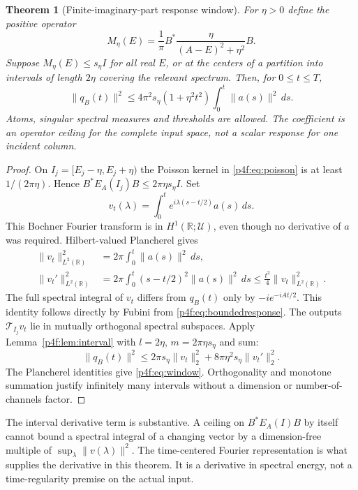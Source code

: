 \documentclass[11pt]{article}
\numberwithin{equation}{section}
\newtheorem{theorem}{Theorem}[section]
\theoremstyle{definition}
\theoremstyle{remark}
\begin{document}
\begin{theorem}[Finite-imaginary-part response window]
\label{p4f:thm:window}
For $\eta>0$ define the positive operator
\begin{equation}\label{p4f:eq:poisson}
 M_\eta(E)=\frac1\pi B^*
             \frac{\eta}{(A-E)^2+\eta^2}B .
\end{equation}
Suppose $M_\eta(E)\le s_\eta I$ for all real $E$,
or at the centers of a partition into intervals of
length $2\eta$ covering the relevant spectrum.
Then, for $0\le t\le T$,
\begin{equation}\label{p4f:eq:window}
 \|q_B(t)\|^2\le
 4\pi^2s_\eta(1+\eta^2t^2)
                   \int_0^t\|a(s)\|^2\,ds .
\end{equation}
Atoms, singular spectral measures and thresholds are allowed.
The coefficient is an operator ceiling for the complete
input space, not a scalar response for one incident column.
\end{theorem}

\begin{proof}
On $I_j=[E_j-\eta,E_j+\eta)$ the Poisson kernel in
\eqref{p4f:eq:poisson} is at least $1/(2\pi\eta)$.
Hence
$B^*E_A(I_j)B\le2\pi\eta s_\eta I$.
Set
\[
 v_t(\lambda)=\int_0^t
                  e^{i\lambda(s-t/2)}a(s)\,ds .
\]
This Bochner Fourier transform is in
$H^1(\mathbb R;\mathcal U)$, even though no derivative
of $a$ was required. Hilbert-valued Plancherel gives
\begin{align*}
 \|v_t\|_{L^2(\mathbb R)}^2
     &=2\pi\int_0^t\|a(s)\|^2\,ds,\\
 \|v_t'\|_{L^2(\mathbb R)}^2
     &=2\pi\int_0^t(s-t/2)^2\|a(s)\|^2\,ds
       \le\frac{t^2}{4}\|v_t\|_{L^2(\mathbb R)}^2.
\end{align*}
The full spectral integral of $v_t$ differs from
$q_B(t)$ only by $-i e^{-iAt/2}$. This identity follows
directly by Fubini from \eqref{p4f:eq:boundedresponse}.
The outputs $\mathcal T_{I_j}v_t$ lie in mutually
orthogonal spectral subspaces. Apply
Lemma~\ref{p4f:lem:interval} with
$l=2\eta$, $m=2\pi\eta s_\eta$ and sum:
\[
 \|q_B(t)\|^2
 \le 2\pi s_\eta\|v_t\|_2^2+
                    8\pi\eta^2s_\eta\|v_t'\|_2^2 .
\]
The Plancherel identities give
\eqref{p4f:eq:window}. Orthogonality and monotone
summation justify infinitely many intervals without
a dimension or number-of-channels factor.
\end{proof}

The interval derivative term is substantive. A ceiling
on $B^*E_A(I)B$ by itself cannot bound a spectral integral
of a changing vector by a dimension-free multiple of
$\sup_\lambda\|v(\lambda)\|^2$. The time-centered Fourier
representation is what supplies the derivative in
this theorem. It is a derivative in spectral energy,
not a time-regularity premise on the actual input.
\end{document}
